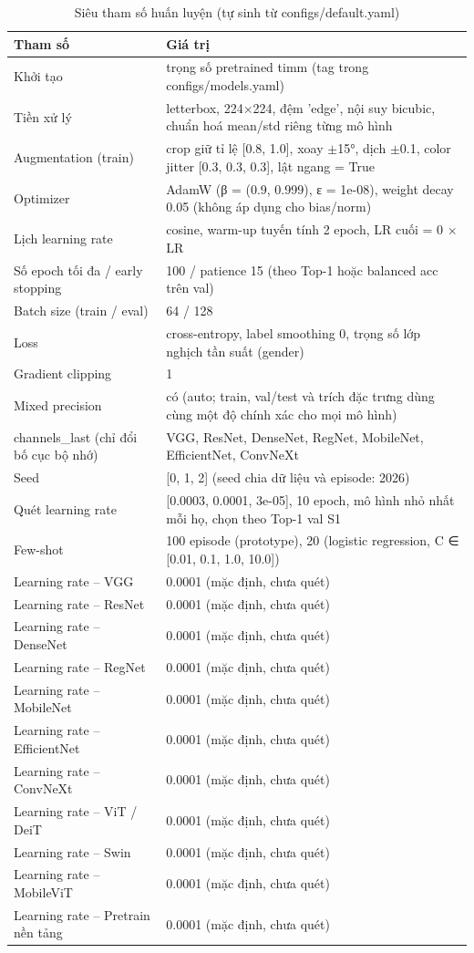 \begin{table}[t]
\centering
\small
\caption{Siêu tham số huấn luyện (tự sinh từ configs/default.yaml)}
\begin{tabular}{ll}
\toprule
Tham số & Giá trị \\
\midrule
Khởi tạo & trọng số pretrained timm (tag trong configs/models.yaml) \\
Tiền xử lý & letterbox, 224×224, đệm 'edge', nội suy bicubic, chuẩn hoá mean/std riêng từng mô hình \\
Augmentation (train) & crop giữ tỉ lệ [0.8, 1.0], xoay $\pm$15°, dịch $\pm$0.1, color jitter [0.3, 0.3, 0.3], lật ngang = True \\
Optimizer & AdamW (β = (0.9, 0.999), ε = 1e-08), weight decay 0.05 (không áp dụng cho bias/norm) \\
Lịch learning rate & cosine, warm-up tuyến tính 2 epoch, LR cuối = 0 × LR \\
Số epoch tối đa / early stopping & 100 / patience 15 (theo Top-1 hoặc balanced acc trên val) \\
Batch size (train / eval) & 64 / 128 \\
Loss & cross-entropy, label smoothing 0, trọng số lớp nghịch tần suất (gender) \\
Gradient clipping & 1 \\
Mixed precision & có (auto; train, val/test và trích đặc trưng dùng cùng một độ chính xác cho mọi mô hình) \\
channels\_last (chỉ đổi bố cục bộ nhớ) & VGG, ResNet, DenseNet, RegNet, MobileNet, EfficientNet, ConvNeXt \\
Seed & [0, 1, 2] (seed chia dữ liệu và episode: 2026) \\
Quét learning rate & [0.0003, 0.0001, 3e-05], 10 epoch, mô hình nhỏ nhất mỗi họ, chọn theo Top-1 val S1 \\
Few-shot & 100 episode (prototype), 20 (logistic regression, C ∈ [0.01, 0.1, 1.0, 10.0]) \\
Learning rate – VGG & 0.0001 (mặc định, chưa quét) \\
Learning rate – ResNet & 0.0001 (mặc định, chưa quét) \\
Learning rate – DenseNet & 0.0001 (mặc định, chưa quét) \\
Learning rate – RegNet & 0.0001 (mặc định, chưa quét) \\
Learning rate – MobileNet & 0.0001 (mặc định, chưa quét) \\
Learning rate – EfficientNet & 0.0001 (mặc định, chưa quét) \\
Learning rate – ConvNeXt & 0.0001 (mặc định, chưa quét) \\
Learning rate – ViT / DeiT & 0.0001 (mặc định, chưa quét) \\
Learning rate – Swin & 0.0001 (mặc định, chưa quét) \\
Learning rate – MobileViT & 0.0001 (mặc định, chưa quét) \\
Learning rate – Pretrain nền tảng & 0.0001 (mặc định, chưa quét) \\
\bottomrule
\end{tabular}
\end{table}
